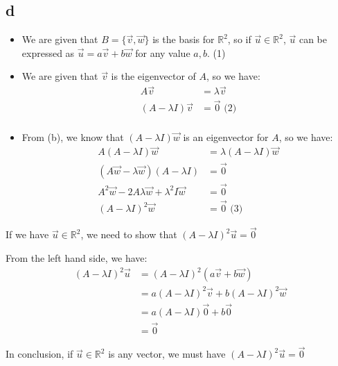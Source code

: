 \documentclass[10pt]{article}
\begin{document}
\subsection*{d}
\begin{itemize}
    \item We are given that $B=\{\Vec{v}, \Vec{w}\}$ is the basis for $\mathbb{R}^2$, so if $\Vec{u}\in \mathbb{R}^2$, $\Vec{u}$ can be expressed as $\Vec{u} = a\Vec{v} + b\Vec{w}$ for any value $a, b$. (1)
    \item We are given that $\Vec{v}$ is the eigenvector of $A$, so we have:
    \begin{align*}
        A\Vec{v} &= \lambda \Vec{v} \\
        (A - \lambda I) \Vec{v} &= \Vec{0} \text{ (2)} \\
    \end{align*}
    \item From (b), we know that $(A-\lambda I)\Vec{w}$ is an eigenvector for $A$, so we have:
    \begin{align*}
        A(A-\lambda I)\Vec{w} &= \lambda (A-\lambda I)\Vec{w} \\
        (A\Vec{w} - \lambda \Vec{w})(A-\lambda I) &= \Vec{0} \\
        A^2 \Vec{w} - 2A\lambda \Vec{w} + \lambda^2 I \Vec{w} &= \Vec{0} \\
        (A - \lambda I)^2 \Vec{w} &= \Vec{0} \text{ (3)}
    \end{align*}
\end{itemize}

\noindent If we have $\Vec{u}\in \mathbb{R}^2$, we need to show that $(A - \lambda I)^2\Vec{u} = \Vec{0}$ \par
\noindent From the left hand side, we have:
\begin{align*}
    (A - \lambda I)^2\Vec{u}
    &= (A - \lambda I)^2 (a\Vec{v} + b\Vec{w}) \\
    &= a(A - \lambda I)^2 \Vec{v} + b(A - \lambda I)^2 \Vec{w} \\
    &= a(A-\lambda I)\Vec{0} + b\Vec{0} \\
    &= \Vec{0}
\end{align*}

\noindent In conclusion, if $\Vec{u}\in \mathbb{R}^2$ is any vector, we must have $(A - \lambda I)^2\Vec{u} = \Vec{0}$
\end{document}
